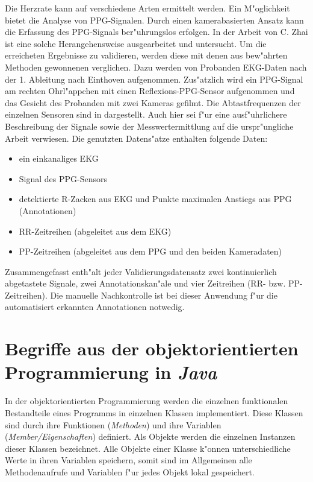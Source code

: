 Die Herzrate kann auf verschiedene Arten ermittelt werden.
Ein M"oglichkeit bietet die Analyse von \ac{PPG}-Signalen.
Durch einen kamerabasierten Ansatz kann die Erfassung des \ac{PPG}-Signals ber"uhrungslos erfolgen.
In der Arbeit von C. Zhai \cite{Zhai2012} ist eine solche Herangehensweise ausgearbeitet und untersucht.
Um die erreicheten Ergebnisse zu validieren, werden diese mit denen aus bew"ahrten Methoden gewonnenen verglichen.
Dazu werden von Probanden \ac{EKG}-Daten nach der 1. Ableitung nach Einthoven aufgenommen.
Zus"atzlich wird ein \ac{PPG}-Signal am rechten Ohrl"appchen mit einen Reflexions-\ac{PPG}-Sensor aufgenommen und das Gesicht des Probanden mit zwei Kameras gefilmt.
Die Abtastfrequenzen der einzelnen Sensoren sind in  dargestellt.
Auch hier sei f"ur eine ausf"uhrlichere Beschreibung der Signale sowie der Messwertermittlung auf die urspr"ungliche Arbeit \cite{Zhai2012} verwiesen.
Die genutzten Datens"atze enthalten folgende Daten:
\begin{itemize}
	\item ein einkanaliges \ac{EKG}
	\item Signal des \ac{PPG}-Sensors
	\item detektierte R-Zacken aus \ac{EKG} und Punkte maximalen Anstiegs aus \ac{PPG} (Annotationen)
	\item RR-Zeitreihen (abgeleitet aus dem \ac{EKG})
	\item PP-Zeitreihen (abgeleitet aus dem \ac{PPG} und den beiden Kameradaten)
\end{itemize}
Zusammengefasst enth"alt jeder Validierungsdatensatz zwei kontinuierlich abgetastete Signale, zwei Annotationskan"ale und vier Zeitreihen (RR- bzw. PP-Zeitreihen).
Die manuelle Nachkontrolle ist bei dieser Anwendung f"ur die automatisiert erkannten Annotationen notwedig.


\section{Begriffe aus der objektorientierten Programmierung in \emph{Java}}

In der objektorientierten Programmierung werden die einzelnen funktionalen Bestandteile eines Programms in einzelnen Klassen implementiert.
Diese Klassen sind durch ihre Funktionen (\emph{Methoden}) und ihre Variablen (\emph{Member/Eigenschaften}) definiert.
Als Objekte werden die einzelnen Instanzen dieser Klassen bezeichnet.
Alle Objekte einer Klasse k"onnen unterschiedliche Werte in ihren Variablen speichern, somit sind im Allgemeinen alle Methodenaufrufe und Variablen f"ur jedes Objekt lokal gespeichert.

